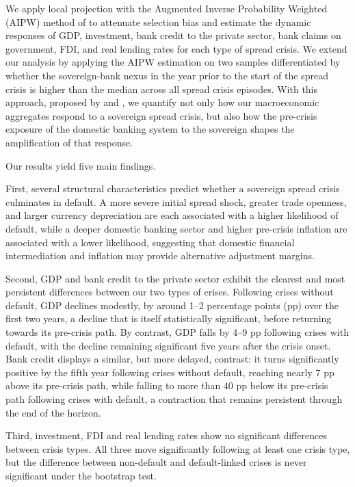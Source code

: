 \documentclass[12pt]{article}
\begin{document}
We apply local projection with the Augmented Inverse Probability Weighted
(AIPW) method of \citet{jorda2016time} to attenuate selection bias and
estimate the dynamic responses of GDP, investment, bank credit to the
private sector, bank claims on government, FDI, and real lending rates for
each type of spread crisis. We extend our analysis by applying the AIPW
estimation on two samples differentiated by whether the sovereign-bank
nexus in the year prior to the start of the spread crisis is higher than
the median across all spread crisis episodes. With this approach, proposed
by \citet{auerbach2016effects} and \citet{jorda2016time}, we
quantify not only how our macroeconomic aggregates respond to a sovereign
spread crisis, but also how the pre-crisis exposure of the domestic
banking system to the sovereign shapes the amplification of that response.

Our results yield five main findings.

First, several structural characteristics predict whether a sovereign
spread crisis culminates in default. A more severe initial spread
shock, greater trade openness, and larger currency depreciation are
each associated with a higher likelihood of default, while a deeper
domestic banking sector and higher pre-crisis inflation are associated
with a lower likelihood, suggesting that domestic financial
intermediation and inflation may provide alternative adjustment
margins.

Second, GDP and bank credit to the private sector exhibit the clearest
and most persistent differences between our two types of crises.
Following crises without default, GDP declines modestly, by around
1--2 percentage points (pp) over the first two years, a decline that
is itself statistically significant, before returning towards its
pre-crisis path. By contrast, GDP falls by 4--9 pp following crises
with default, with the decline remaining significant five years after
the crisis onset. Bank credit displays a similar, but more delayed,
contrast: it turns significantly positive by the fifth year following
crises without default, reaching nearly 7 pp above its pre-crisis
path, while falling to more than 40 pp below its pre-crisis path
following crises with default, a contraction that remains persistent
through the end of the horizon.

Third, investment, FDI and real lending rates show no significant
differences between crisis types. All three move significantly
following at least one crisis type, but the difference between
non-default and default-linked crises is never significant under the
bootstrap test.
\end{document}
